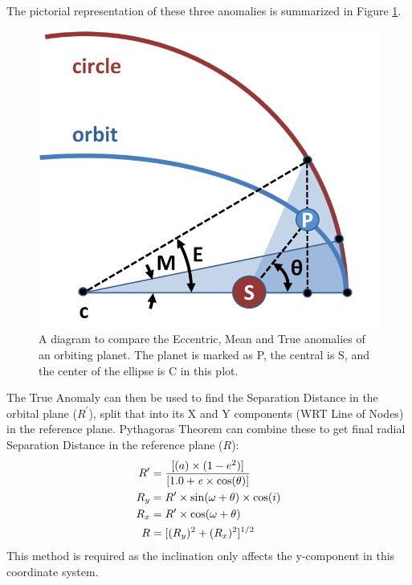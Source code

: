 \documentclass[10pt,preprint]{aastex}
\begin{document}
The pictorial representation of these three anomalies is summarized in Figure \ref{fig:Anomalies}.

\begin{figure}[ht]
\begin{center}
\includegraphics[scale=0.4]{Anomalies-MOD.png}
\caption[Diagram of Anomalies]{A diagram to compare the Eccentric, Mean and True anomalies of an orbiting planet.  The planet is marked as P, the central is S, and the center of the ellipse is C in this plot. }
\label{fig:Anomalies}
\end{center}
\end{figure}

The True Anomaly can then be used to find the Separation Distance in the orbital plane ($R^{\prime}$), split that into its X and Y components (WRT Line of Nodes) in the reference plane.  Pythagoras Theorem can combine these to get final radial Separation Distance in the reference plane ($R$):
\begin{subequations}
\begin{align}
\label{eq:4.1.6a}
R^{\prime}& = \frac{[(a)\times(1-e^{2})]}{[1.0 +{\it e}\times \cos(\theta)]}\\
\label{eq:4.1.6b}
R_y& = R^{\prime} \times \sin(\omega + \theta) \times \cos(i)\\
\label{eq:4.1.6c}
R_x& = R^{\prime} \times \cos(\omega + \theta)\\
\label{eq:4.1.6d}
R& = [(R_y)^{2} + (R_x)^{2}]^{1/2}
\end{align}
\end{subequations}
This method is required as the inclination only affects the y-component in this coordinate system.
\end{document}
